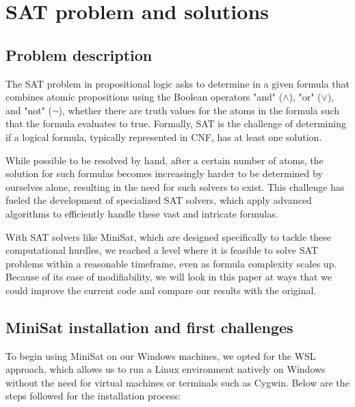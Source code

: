\documentclass[runningheads]{llncs}
\begin{document}
\newpage

\section{SAT problem and solutions}
\subsection{Problem description}

The \ac{SAT} problem in propositional logic asks to determine in a given formula that combines atomic propositions using the Boolean operators "and" ($\land$), "or" ($\lor$), and "not" ($\neg$), whether there are truth values for the atoms in the formula such that the formula evaluates to true. Formally, \ac{SAT} is the challenge of determining if a logical formula, typically represented in \ac{CNF}, has at least one solution.

While possible to be resolved by hand, after a certain number of atoms, the solution for such formulas becomes increasingly harder to be determined by ourselves alone, resulting in the need for such solvers to exist. This challenge has fueled the development of specialized \ac{SAT} solvers, which apply advanced algorithms to efficiently handle these vast and intricate formulas.

With \ac{SAT} solvers like MiniSat, which are designed specifically to tackle these computational hurdles, we reached a level where it is feasible to solve \ac{SAT} problems within a reasonable timeframe, even as formula complexity scales up. Because of its ease of modifiability, we will look in this paper at ways that we could improve the current code and compare our results with the original.

\subsection{MiniSat installation and first challenges}

To begin using MiniSat on our Windows machines, we opted for the \ac{WSL} approach, which allows us to run a Linux environment natively on Windows without the need for virtual machines or terminals such as Cygwin. Below are the steps followed for the installation process:
\end{document}

